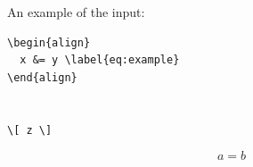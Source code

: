 An example of the input:
\begin{verbatim}
\begin{align}
  x &= y \label{eq:example}
\end{align}


\[ z \]
\end{verbatim}
\begin{equation}
  a = b
\end{equation}
